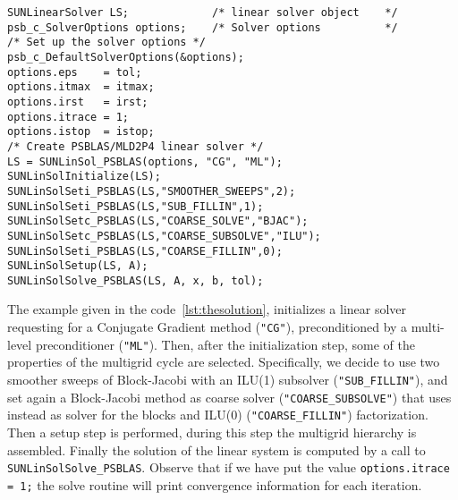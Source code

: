 \documentclass[twoside,a4paper]{refart}
\theoremstyle{definition}
\begin{document}
\begin{lstlisting}[style=CStyle,caption="An example of solution with PCG preconditioned by a ML preconditioner",label=lst:thesolution]
SUNLinearSolver LS;             /* linear solver object    */
psb_c_SolverOptions options;    /* Solver options          */
/* Set up the solver options */
psb_c_DefaultSolverOptions(&options);
options.eps    = tol;
options.itmax  = itmax;
options.irst   = irst;
options.itrace = 1;
options.istop  = istop;
/* Create PSBLAS/MLD2P4 linear solver */
LS = SUNLinSol_PSBLAS(options, "CG", "ML");
SUNLinSolInitialize(LS);
SUNLinSolSeti_PSBLAS(LS,"SMOOTHER_SWEEPS",2);
SUNLinSolSeti_PSBLAS(LS,"SUB_FILLIN",1);
SUNLinSolSetc_PSBLAS(LS,"COARSE_SOLVE","BJAC");
SUNLinSolSetc_PSBLAS(LS,"COARSE_SUBSOLVE","ILU");
SUNLinSolSeti_PSBLAS(LS,"COARSE_FILLIN",0);
SUNLinSolSetup(LS, A);
SUNLinSolSolve_PSBLAS(LS, A, x, b, tol);
\end{lstlisting}

The example given in the code~\ref{lst:thesolution}, initializes a linear solver requesting for a Conjugate Gradient method (\lstinline[style=CStyle]|"CG"|), preconditioned by a multi-level preconditioner (\lstinline[style=CStyle]|"ML"|). Then, after the initialization step, some of the properties of the multigrid cycle are selected. Specifically, we decide to use two smoother sweeps of Block-Jacobi with an ILU(1) subsolver (\lstinline[style=CStyle]|"SUB_FILLIN"|), and set again a Block-Jacobi method as coarse solver (\lstinline[style=CStyle]|"COARSE_SUBSOLVE"|) that uses instead as solver for the blocks and ILU(0) (\lstinline[style=CStyle]|"COARSE_FILLIN"|) factorization. Then a setup step is performed, during this step the multigrid hierarchy is assembled. Finally the solution of the linear system is computed by a call to \lstinline[style=CStyle]|SUNLinSolSolve_PSBLAS|. Observe that if we have put the value \lstinline[style=CStyle]|options.itrace = 1;| the solve routine will print convergence information for each iteration.

\appendix
\end{document}
